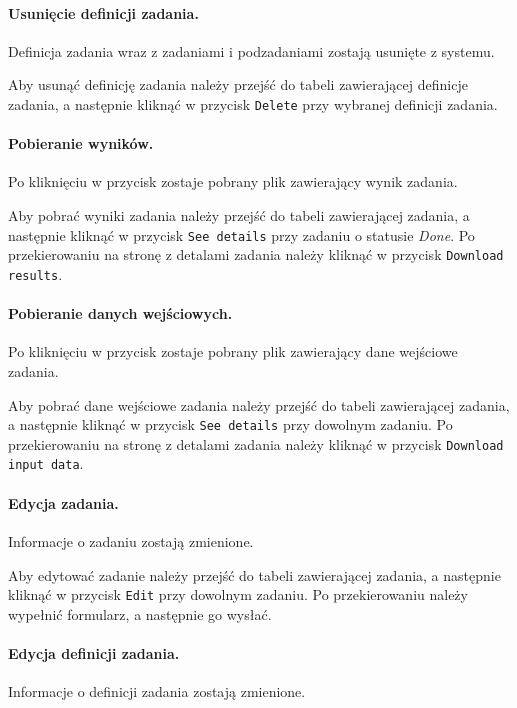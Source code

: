 \documentclass[a4paper,11pt,twoside]{report}
\theoremstyle{definition}
\begin{document}
            \paragraph{Usunięcie definicji zadania.}    
                \noindent Definicja zadania wraz z zadaniami i podzadaniami zostają usunięte z systemu.
                
                Aby usunąć definicję zadania należy przejść do tabeli zawierającej definicje zadania, a następnie kliknąć w przycisk \texttt{Delete} przy wybranej definicji zadania. 

            \paragraph{Pobieranie wyników.} 
                \noindent Po kliknięciu w przycisk zostaje pobrany plik zawierający
                wynik zadania.
                
                Aby pobrać wyniki zadania należy przejść do tabeli zawierającej zadania, a następnie kliknąć w przycisk \texttt{See details} przy zadaniu o statusie \textit{Done}. Po przekierowaniu na stronę z detalami zadania należy kliknąć w przycisk \texttt{Download results}.

            \paragraph{Pobieranie danych wejściowych.}  
                \noindent Po kliknięciu w przycisk zostaje pobrany plik zawierający dane wejściowe zadania.
                
                Aby pobrać dane wejściowe zadania należy przejść do tabeli zawierającej zadania, a następnie kliknąć w przycisk \texttt{See details} przy dowolnym zadaniu. Po przekierowaniu na stronę z detalami zadania należy kliknąć w przycisk \texttt{Download input data}.

            \paragraph{Edycja zadania.}  
                \noindent Informacje o zadaniu zostają zmienione.
                
                Aby edytować zadanie należy przejść do tabeli zawierającej zadania, a następnie kliknąć w przycisk \texttt{Edit} przy dowolnym zadaniu. Po przekierowaniu należy wypełnić formularz, a następnie go wysłać.

            \paragraph{Edycja definicji zadania.}    
                \noindent Informacje o definicji zadania zostają zmienione.
                
\end{document}
